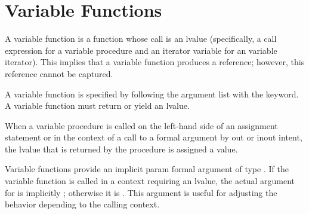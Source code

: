\section{Variable Functions}
\label{Variable_Functions}

A variable function is a function whose call is an lvalue
(specifically, a call expression for a variable procedure and
an iterator variable for an variable iterator).
This implies that a variable function produces a reference;
however, this
reference cannot be captured.

A variable function is specified by following the argument list with
the  keyword.  A variable function must return or yield an lvalue.

When a variable procedure is called on the left-hand side of an
assignment statement or in the context of a call to a formal argument
by out or inout intent, the lvalue that is returned by the procedure is
assigned a value.

Variable functions provide an implicit param formal argument 
of type .  If the
variable function is called in a context requiring an lvalue,
the actual argument for  is implicitly ;
otherwise it is .  This argument is useful for adjusting
the behavior depending to the calling context.

